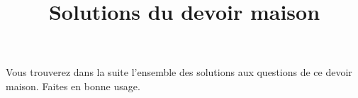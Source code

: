 \documentclass[11pt, a4paper]{article}
\begin{document}
\newpage 

\pretitle{\vspace{-2\baselineskip} \begin{center}}
\title{%
  { \huge Solutions du devoir maison}%
}
\posttitle{
\end{center}
  \vspace{.5\baselineskip}
  \rule{\textwidth}{1.5pt}
  \vspace{-5\baselineskip}
}

\maketitle\thispagestyle{fancy}

\noindent Vous trouverez dans la suite l'ensemble des solutions aux questions de
ce devoir maison. Faites en bonne usage.

\printsolutions




\end{document}
